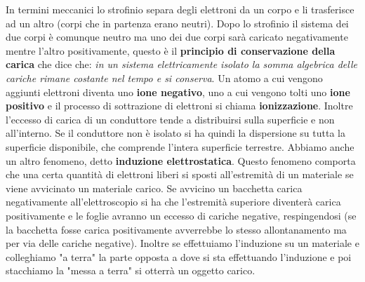 \documentclass[a4paper,12pt, oneside]{book}
\begin{document}
In termini meccanici lo strofinio separa degli elettroni da un corpo e li trasferisce ad un altro (corpi che in partenza erano neutri). Dopo lo strofinio il sistema dei due corpi è comunque neutro ma uno dei due corpi sarà caricato negativamente mentre l'altro positivamente, questo è il \textbf{principio di conservazione della carica} che dice che: \textit{in un sistema elettricamente isolato la somma algebrica delle cariche rimane costante nel tempo e si conserva}. Un atomo a cui vengono aggiunti elettroni diventa uno \textbf{ione negativo}, uno a cui vengono tolti uno \textbf{ione positivo} e il processo di sottrazione di elettroni si chiama \textbf{ionizzazione}. Inoltre l'eccesso di carica di un conduttore tende a distribuirsi sulla superficie e non all'interno. Se il conduttore non è isolato si ha quindi la dispersione su tutta la superficie disponibile, che comprende l'intera superficie terrestre. Abbiamo anche un altro fenomeno, detto \textbf{induzione elettrostatica}. Questo fenomeno comporta che una certa quantità di elettroni liberi si sposti all'estremità di un materiale se viene avvicinato un materiale carico. Se avvicino un bacchetta carica negativamente all'elettroscopio si ha che l'estremità superiore diventerà carica positivamente e le foglie avranno un eccesso di cariche negative, respingendosi (se la bacchetta fosse carica positivamente avverrebbe lo stesso allontanamento ma per via delle cariche negative). Inoltre se effettuiamo l'induzione su un materiale e colleghiamo "a terra" la parte opposta a dove si sta effettuando l'induzione e poi stacchiamo la "messa a terra" si otterrà un oggetto carico.
\end{document}
